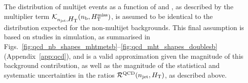 The distribution of multijet events as a function of \nb and \HTmiss,
as described by the multiplier term $\mathcal{K}_{n_{\text{jet}}, \mbox{$H_\text{T}$}}(
n_{\text{b}}, \mbox{$H_{\rm T}^{\rm miss}$} )$, is assumed to be identical to the distribution
expected for the non-multijet backgrounds. This final assumption is
based on studies in simulation, as summarised in
Figs.~\ref{fig:qcd_nb_shapes_mhtmetsb}--\ref{fig:qcd_mht_shapes_doublesb}
(Appendix~\ref{app:qcd}), and is a valid approximation given the
magnitude of this background contribution, as well as the magnitude of
the statistical and systematic uncertainties in the ratios
$\mathcal{R}^\mathrm{QCD}(n_{\text{jet}}, \mbox{$H_\text{T}$})$, as described above.






